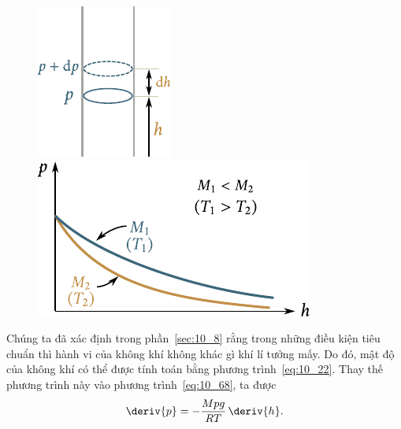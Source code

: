 \begin{figure}[!htb]
	\begin{minipage}[t]{0.4\linewidth}
		\begin{center}
			\includegraphics[scale=1.0]{figures/ch_10/fig_10_7.pdf}
			\caption[]{}
			\label{fig:10_7}
		\end{center}
	\end{minipage}
	\hspace{-0.05cm}
	\begin{minipage}[t]{0.5\linewidth}
		\begin{center}
			\includegraphics[scale=1.0]{figures/ch_10/fig_10_8.pdf}
			\caption[]{}
			\label{fig:10_8}
		\end{center}
	\end{minipage}
\end{figure}


Chúng ta đã xác định trong phần~\ref{sec:10_8} rằng trong những điều kiện tiêu chuẩn thì hành vi của không khí không khác gì khí lí tưởng mấy. Do đó, mật độ của không khí có thể được tính toán bằng phương trình~\eqref{eq:10_22}. Thay thế phương trình này vào phương trình~\eqref{eq:10_68}, ta được
\begin{equation}\label{eq:10_69}
	\deriv{p} = -\frac{Mpg}{RT}\,\deriv{h}.
\end{equation}

